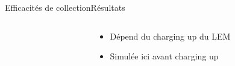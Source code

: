 \begin{frame}{Efficacités de collection}{Résultats}
\begin{columns}
\begin{column}{0.5\textwidth}
\begin{scriptsize}
                \end{scriptsize}
            \end{column}\hfill
            \begin{column}{0.5\textwidth}
              \begin{scriptsize}
                \begin{itemize}
                    \item Dépend du charging up du LEM
                    \item Simulée ici avant charging up
                \end{itemize}
              \end{scriptsize}
            \end{column}
        \end{columns}
    \end{frame}
    
